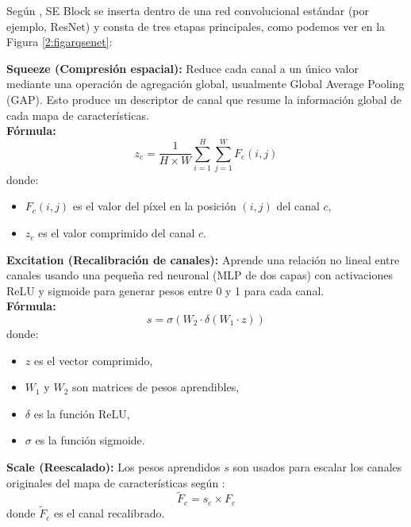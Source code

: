 \begin{itemize}
Según \cite{autor2022cnn}, SE Block se inserta dentro de una red convolucional estándar (por ejemplo, ResNet) y consta de tres etapas principales, como podemos ver en la Figura \ref{2:figarqsenet}:

\textbf{Squeeze (Compresión espacial):}
Reduce cada canal a un único valor mediante una operación de agregación global, usualmente Global Average Pooling (GAP). Esto produce un descriptor de canal que resume la información global de cada mapa de características. \parencite{autor2022cnn}
\\
\textbf{Fórmula:}
\begin{equation}\label{eq:squeeze}
    z_c = \frac{1}{H \times W} \sum_{i=1}^{H} \sum_{j=1}^{W} F_c(i,j)
\end{equation}
donde:
\begin{itemize}[label=$\bullet$, leftmargin=1em]
    \item $F_c(i,j)$ es el valor del píxel en la posición $(i,j)$ del canal $c$,
    \item $z_c$ es el valor comprimido del canal $c$.
\end{itemize}

\textbf{Excitation (Recalibración de canales):}
Aprende una relación no lineal entre canales usando una pequeña red neuronal (MLP de dos capas) con activaciones ReLU y sigmoide para generar pesos entre 0 y 1 para cada canal. \parencite{autor2022cnn}
\\
\textbf{Fórmula:}
\begin{equation}\label{eq:excitation}
    s = \sigma(W_2 \cdot \delta(W_1 \cdot z))
\end{equation}
donde:
\begin{itemize}[label=$\bullet$, leftmargin=1em]
    \item $z$ es el vector comprimido,
    \item $W_1$ y $W_2$ son matrices de pesos aprendibles,
    \item $\delta$ es la función ReLU,
    \item $\sigma$ es la función sigmoide.
\end{itemize}

\textbf{Scale (Reescalado):}
Los pesos aprendidos $s$ son usados para escalar los canales originales del mapa de características según \cite{autor2022cnn}:
\begin{equation}\label{eq:scale}
    \tilde{F}_c = s_c \times F_c
\end{equation}
donde $\tilde{F}_c$ es el canal recalibrado.


\end{itemize}
